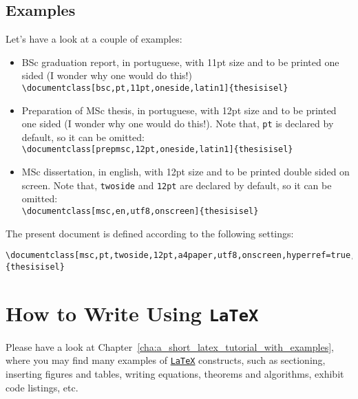 
\subsection{Examples} %
\label{ssec:examples}

Let's have a look at a couple of examples:

\begin{itemize}
    \item BSc graduation report, in portuguese, with 11pt size and to be printed one sided (I wonder why one would do this!)\\
    \verb!\documentclass[bsc,pt,11pt,oneside,latin1]{thesisisel}!
    \item Preparation of MSc thesis, in portuguese, with 12pt size and to be printed one sided (I wonder why one would do this!). Note that, \verb!pt! is declared by default, so it can be omitted: \\
    \verb!\documentclass[prepmsc,12pt,oneside,latin1]{thesisisel}!
    \item MSc dissertation, in english, with 12pt size and to be printed double sided on screen. Note that, \verb!twoside! and \verb!12pt! are declared by default, so it can be omitted: \\
    \verb!\documentclass[msc,en,utf8,onscreen]{thesisisel}!
\end{itemize}


The present document is defined according to the following settings:
\begin{Verbatim}[breaklines=true, breakanywhere=true]
\documentclass[msc,pt,twoside,12pt,a4paper,utf8,onscreen,hyperref=true,listof=totoc] {thesisisel}
\end{Verbatim}



\section{How to Write Using \texttt{LaTeX}} %
\label{sec:how_to_write_using_latex}

Please have a look at Chapter~\ref{cha:a_short_latex_tutorial_with_examples}, where you may find many examples of \href{http://tobi.oetiker.ch/lshort/lshort.pdf}{\texttt{LaTeX}} constructs, such as sectioning, inserting figures and tables, writing equations, theorems and algorithms, exhibit code listings, etc.

